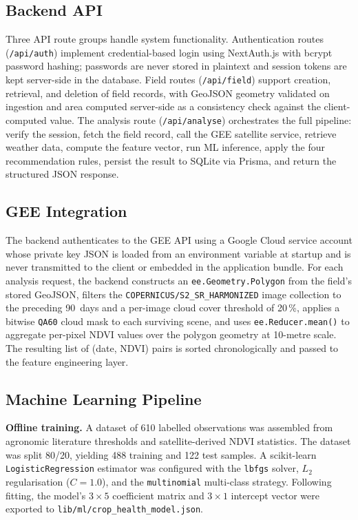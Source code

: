 \documentclass[conference]{IEEEtran}
\begin{document}
\subsection{Backend API}

Three API route groups handle system functionality. Authentication routes
(\texttt{/api/auth}) implement credential-based login using NextAuth.js
with bcrypt password hashing; passwords are never stored in plaintext and
session tokens are kept server-side in the database. Field routes
(\texttt{/api/field}) support creation, retrieval, and deletion of field
records, with GeoJSON geometry validated on ingestion and area computed
server-side as a consistency check against the client-computed value. The
analysis route (\texttt{/api/analyse}) orchestrates the full pipeline:
verify the session, fetch the field record, call the GEE satellite
service, retrieve weather data, compute the feature vector, run ML
inference, apply the four recommendation rules, persist the result to
SQLite via Prisma, and return the structured JSON response.

\subsection{GEE Integration}

The backend authenticates to the GEE API using a Google Cloud service
account whose private key JSON is loaded from an environment variable at
startup and is never transmitted to the client or embedded in the
application bundle. For each analysis request, the backend constructs an
\texttt{ee.Geometry.Polygon} from the field's stored GeoJSON, filters
the \texttt{COPERNICUS/S2\_SR\_HARMONIZED} image collection to the
preceding 90~days and a per-image cloud cover threshold of 20\,\%,
applies a bitwise \texttt{QA60} cloud mask to each surviving scene, and
uses \texttt{ee.Reducer.mean()} to aggregate per-pixel NDVI values over
the polygon geometry at 10-metre scale. The resulting list of (date, NDVI)
pairs is sorted chronologically and passed to the feature engineering
layer.

\subsection{Machine Learning Pipeline}

\textbf{Offline training.} A dataset of 610 labelled observations was
assembled from agronomic literature thresholds and satellite-derived NDVI
statistics. The dataset was split 80/20, yielding 488 training and 122
test samples. A scikit-learn \texttt{LogisticRegression} estimator was
configured with the \texttt{lbfgs} solver, $L_2$ regularisation
($C{=}1.0$), and the \texttt{multinomial} multi-class strategy. Following
fitting, the model's $3{\times}5$ coefficient matrix and $3{\times}1$
intercept vector were exported to \texttt{lib/ml/crop\_health\_model.json}.
\end{document}
